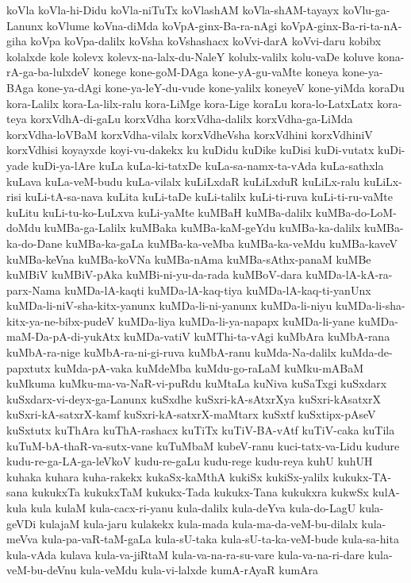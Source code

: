 {koVla
koVla-hi-Didu
koVla-niTuTx
koVlashAM
koVla-shAM-tayayx
koVlu-ga-Lanunx
koVlume
koVna-diMda
koVpA-ginx-Ba-ra-nAgi
koVpA-ginx-Ba-ri-ta-nA-giha
koVpa
koVpa-dalilx
koVsha
koVshashacx
koVvi-darA
koVvi-daru
kobibx
kolalxde
kole
kolevx
kolevx-na-lalx-du-NaleY
kolulx-valilx
kolu-vaDe
koluve
kona-rA-ga-ba-lulxdeV
konege
kone-goM-DAga
kone-yA-gu-vaMte
koneya
kone-ya-BAga
kone-ya-dAgi
kone-ya-leY-du-vude
kone-yalilx
koneyeV
kone-yiMda
koraDu
kora-Lalilx
kora-La-lilx-ralu
kora-LiMge
kora-Lige
koraLu
kora-lo-LatxLatx
kora-teya
korxVdhA-di-gaLu
korxVdha
korxVdha-dalilx
korxVdha-ga-LiMda
korxVdha-loVBaM
korxVdha-vilalx
korxVdheVsha
korxVdhini
korxVdhiniV
korxVdhisi
koyayxde
koyi-vu-dakekx
ku
kuDidu
kuDike
kuDisi
kuDi-vutatx
kuDi-yade
kuDi-ya-lAre
kuLa
kuLa-ki-tatxDe
kuLa-sa-namx-ta-vAda
kuLa-sathxla
kuLava
kuLa-veM-budu
kuLa-vilalx
kuLiLxdaR
kuLiLxduR
kuLiLx-ralu
kuLiLx-risi
kuLi-tA-sa-nava
kuLita
kuLi-taDe
kuLi-talilx
kuLi-ti-ruva
kuLi-ti-ru-vaMte
kuLitu
kuLi-tu-ko-LuLxva
kuLi-yaMte
kuMBaH
kuMBa-dalilx
kuMBa-do-LoM-doMdu
kuMBa-ga-Lalilx
kuMBaka
kuMBa-kaM-geYdu
kuMBa-ka-dalilx
kuMBa-ka-do-Dane
kuMBa-ka-gaLa
kuMBa-ka-veMba
kuMBa-ka-veMdu
kuMBa-kaveV
kuMBa-keVna
kuMBa-koVNa
kuMBa-nAma
kuMBa-sAthx-panaM
kuMBe
kuMBiV
kuMBiV-pAka
kuMBi-ni-yu-da-rada
kuMBoV-dara
kuMDa-lA-kA-ra-parx-Nama
kuMDa-lA-kaqti
kuMDa-lA-kaq-tiya
kuMDa-lA-kaq-ti-yanUnx
kuMDa-li-niV-sha-kitx-yanunx
kuMDa-li-ni-yanunx
kuMDa-li-niyu
kuMDa-li-sha-kitx-ya-ne-bibx-pudeV
kuMDa-liya
kuMDa-li-ya-napapx
kuMDa-li-yane
kuMDa-maM-Da-pA-di-yukAtx
kuMDa-vatiV
kuMThi-ta-vAgi
kuMbAra
kuMbA-rana
kuMbA-ra-nige
kuMbA-ra-ni-gi-ruva
kuMbA-ranu
kuMda-Na-dalilx
kuMda-de-papxtutx
kuMda-pA-vaka
kuMdeMba
kuMdu-go-raLaM
kuMku-mABaM
kuMkuma
kuMku-ma-va-NaR-vi-puRdu
kuMtaLa
kuNiva
kuSaTxgi
kuSxdarx
kuSxdarx-vi-deyx-ga-Lanunx
kuSxdhe
kuSxri-kA-sAtxrXya
kuSxri-kAsatxrX
kuSxri-kA-satxrX-kamf
kuSxri-kA-satxrX-maMtarx
kuSxtf
kuSxtipx-pAseV
kuSxtutx
kuThAra
kuThA-rashacx
kuTiTx
kuTiV-BA-vAtf
kuTiV-caka
kuTila
kuTuM-bA-thaR-va-sutx-vane
kuTuMbaM
kubeV-ranu
kuci-tatx-va-Lidu
kudure
kudu-re-ga-LA-ga-leVkoV
kudu-re-gaLu
kudu-rege
kudu-reya
kuhU
kuhUH
kuhaka
kuhara
kuha-rakekx
kukaSx-kaMthA
kukiSx
kukiSx-yalilx
kukukx-TA-sana
kukukxTa
kukukxTaM
kukukx-Tada
kukukx-Tana
kukukxra
kukwSx
kulA-kula
kula
kulaM
kula-cacx-ri-yanu
kula-dalilx
kula-deYva
kula-do-LagU
kula-geVDi
kulajaM
kula-jaru
kulakekx
kula-mada
kula-ma-da-veM-bu-dilalx
kula-meVva
kula-pa-vaR-taM-gaLa
kula-sU-taka
kula-sU-ta-ka-veM-bude
kula-sa-hita
kula-vAda
kulava
kula-va-jiRtaM
kula-va-na-ra-su-vare
kula-va-na-ri-dare
kula-veM-bu-deVnu
kula-veMdu
kula-vi-lalxde
kumA-rAyaR
kumAra
}
